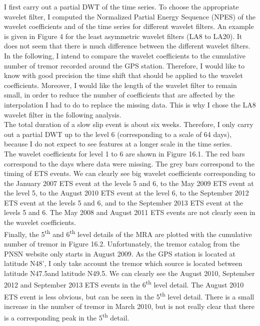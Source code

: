 \documentclass[main.tex]{subfiles}
\begin{document}
I first carry out a partial DWT of the time series. To choose the appropriate wavelet filter, I computed the Normalized Partial Energy Sequence (NPES) of the wavelet coefficients and of the time series for different wavelet filters. An example is given in Figure 4 for the least asymmetric wavelet filters (LA8 to LA20). It does not seem that there is much difference between the different wavelet filters. In the following, I intend to compare the wavelet coefficients to the cumulative number of tremor recorded around the GPS station. Therefore, I would like to know with good precision the time shift that should be applied to the wavelet coefficients. Moreover, I would like the length of the wavelet filter to remain small, in order to reduce the number of coefficients that are affected by the interpolation I had to do to replace the missing data. This is why I chose the LA8 wavelet filter in the following analysis. \\

The total duration of a slow slip event is about six weeks. Therefore, I only carry out a partial DWT up to the level 6 (corresponding to a scale of 64 days), because I do not expect to see features at a longer scale in the time series. \\

The wavelet coefficients for level 1 to 6 are shown in Figure 16.1. The red bars correspond to the days where data were missing. The grey bars correspond to the timing of ETS events.  We can clearly see big wavelet coefficients corresponding to the January 2007 ETS event at the levels 5 and 6, to the May 2009 ETS event at the level 5, to the August 2010 ETS event at the level 6, to the September 2012 ETS event at the levels 5 and 6, and to the September 2013 ETS event at the levels 5 and 6.  The May 2008 and August 2011 ETS events are not clearly seen in the wavelet coefficients. \\

Finally, the 5\textsuperscript{th} and 6\textsuperscript{th} level details of the MRA are plotted with the cumulative number of tremor in Figure 16.2. Unfortunately, the tremor catalog from the PNSN website only starts in August 2009. As the GPS station is located at latitude N48', I only take account the tremor which source is located between latitude N47.5\degree and latitude N49.5\degree. We can clearly see the August 2010, September 2012 and September 2013 ETS events in the 6\textsuperscript{th} level detail. The August 2010 ETS event is less obvious, but can be seen in the 5\textsuperscript{th} level detail. There is a small increase in the number of tremor in March 2010, but is not really clear that there is a corresponding peak in the 5\textsuperscript{th} detail.
\end{document}
